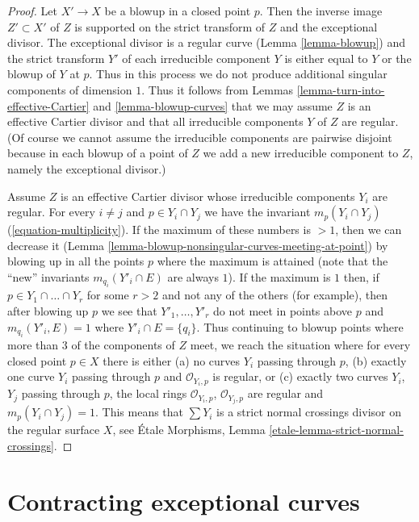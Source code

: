 \documentclass{stacks-project}
\theoremstyle{plain}
\theoremstyle{definition}
\theoremstyle{remark}
\numberwithin{equation}{subsection}
\begin{document}
\begin{proof}
Let $X' \to X$ be a blowup in a closed point $p$. Then the inverse image
$Z' \subset X'$ of $Z$ is supported on the strict transform of $Z$ and
the exceptional divisor. The exceptional divisor is a regular curve
(Lemma \ref{lemma-blowup}) and the strict transform $Y'$ of each irreducible
component $Y$ is either equal to $Y$ or the blowup of $Y$ at $p$.
Thus in this process we do not produce additional singular components
of dimension $1$. Thus it follows from
Lemmas \ref{lemma-turn-into-effective-Cartier} and \ref{lemma-blowup-curves}
that we may assume $Z$ is an effective Cartier divisor and
that all irreducible components $Y$ of $Z$ are regular.
(Of course we cannot assume the irreducible components are
pairwise disjoint because in each blowup of a point of $Z$
we add a new irreducible component to $Z$, namely the exceptional divisor.)

\medskip\noindent
Assume $Z$ is an effective Cartier divisor whose irreducible components
$Y_i$ are regular. For every $i \not = j$
and $p \in Y_i \cap Y_j$ we have the invariant
$m_p(Y_i \cap Y_j)$ (\ref{equation-multiplicity}).
If the maximum of these numbers is $> 1$, then we can decrease
it (Lemma \ref{lemma-blowup-nonsingular-curves-meeting-at-point})
by blowing up in all the points $p$ where the maximum is attained
(note that the ``new'' invariants $m_{q_i}(Y'_i \cap E)$ are always $1$).
If the maximum is $1$ then, if $p \in Y_1 \cap \ldots \cap Y_r$
for some $r > 2$ and not any of the others (for example), then after
blowing up $p$ we see that $Y'_1, \ldots, Y'_r$ do not meet in points
above $p$ and $m_{q_i}(Y'_i, E) = 1$ where $Y'_i \cap E = \{q_i\}$.
Thus continuing to blowup points where more than $3$
of the components of $Z$ meet, we reach the situation where
for every closed point $p \in X$ there is either
(a) no curves $Y_i$ passing through $p$,
(b) exactly one curve $Y_i$ passing through $p$ and $\mathcal{O}_{Y_i, p}$
is regular, or (c) exactly two curves $Y_i$, $Y_j$ passing through
$p$, the local rings $\mathcal{O}_{Y_i, p}$, $\mathcal{O}_{Y_j, p}$
are regular and $m_p(Y_i \cap Y_j) = 1$.
This means that $\sum Y_i$ is a strict normal crossings
divisor on the regular surface $X$, see
\'Etale Morphisms, Lemma
\ref{etale-lemma-strict-normal-crossings}.
\end{proof}






\section{Contracting exceptional curves}
\label{section-minus-one}
\end{document}
